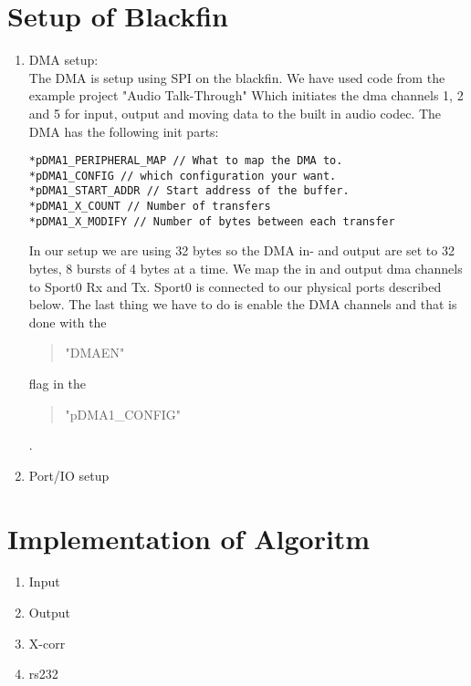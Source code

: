 \chapter{Setup of Blackfin}
\begin{enumerate}
\item DMA setup:\\
The DMA is setup using SPI on the blackfin. We have used code from the example project "Audio Talk-Through" Which initiates the dma channels 1, 2 and 5 for input, output and moving data to the built in audio codec. The DMA has the following init parts:
\begin{verbatim}
*pDMA1_PERIPHERAL_MAP // What to map the DMA to.
*pDMA1_CONFIG // which configuration your want.
*pDMA1_START_ADDR // Start address of the buffer.
*pDMA1_X_COUNT // Number of transfers
*pDMA1_X_MODIFY // Number of bytes between each transfer
\end{verbatim}
In our setup we are using 32 bytes so the DMA in- and output are set to 32 bytes, 8 bursts of 4 bytes at a time. We map the in and output dma channels to Sport0 Rx and Tx. Sport0 is connected to our physical ports described below. The last thing we have to do is enable the DMA channels and that is done with the \begin{quote}
"DMAEN"
\end{quote}  flag in the 
\begin{quote}
"pDMA1\_CONFIG"
\end{quote}
.\\
\item Port/IO setup
\end{enumerate}

\chapter{Implementation of Algoritm}
\begin{enumerate}
\item Input
\item Output
\item X-corr
\item rs232
\end{enumerate}